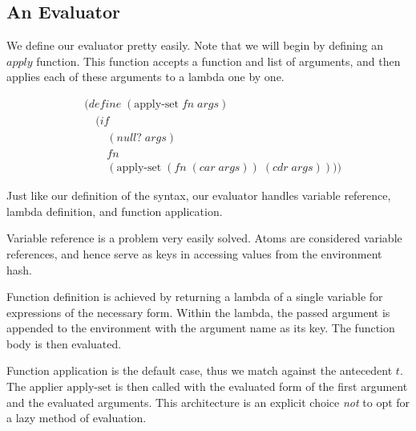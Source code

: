 \subsection{An Evaluator}
We define our evaluator pretty easily. Note that we will begin by defining an 
$apply$ function. This function accepts a function and list of arguments, and 
then applies each of these arguments to a lambda one by one.

\begin{figure}[htp]
\footnotesize
\caption{}\label{fig:applySetDef}
\begin{align*}
& (define \; (\text{apply-set} \; fn \; args)
\\& \quad (if
\\& \qquad (null? \; args)
\\& \qquad fn
\\& \qquad (\text{apply-set} \; (fn \; (car \; args)) \; (cdr \; args))))
\end{align*}
\end{figure}

Just like our definition of the syntax, our evaluator handles variable reference, 
lambda definition, and function application. 

Variable reference is a problem very easily solved. Atoms are considered 
variable references, and hence serve as keys in accessing values from the 
environment hash.

Function definition is achieved by returning a lambda of a single variable for 
expressions of the necessary form. Within the lambda, the passed argument is 
appended to the environment with the argument name as its key. The function body 
is then evaluated.

Function application is the default case, thus we match against the antecedent 
$t$. The applier $\text{apply-set}$ is then called with the evaluated form of the first 
argument and the evaluated arguments. This architecture is an explicit choice 
\emph{not} to opt for a lazy method of evaluation.

